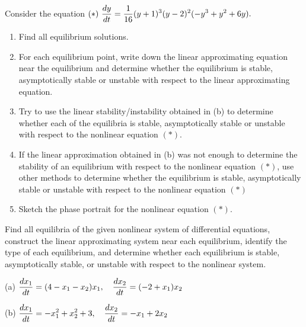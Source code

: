 \LaplaceImpulse


% 
% 





\def\OneDimLinearize{
\item
Consider the equation 
$\displaystyle (*)\  {dy \over dt}= \frac{1}{16} (y+1)^3 (y-2)^2 (-y^3+y^2+6y).$
	\begin{enumerate}
	\item
Find all equilibrium solutions.
	\item
For each equilibrium point, write down the linear approximating equation near the equilibrium and determine whether the equilibrium is stable, asymptotically stable or unstable with respect to the linear approximating equation.
	\item 
Try to use the linear stability/instability obtained in (b) to determine whether each of the equilibria is stable, asymptotically stable or unstable with respect to the nonlinear equation $(*)$.
	\item
If the linear approximation obtained in (b) was not enough to determine the stability of an equilibrium with respect to the nonlinear equation $(*)$, use other methods to determine whether the equilibrium is stable, asymptotically stable or unstable with respect to the nonlinear equation $(*)$
	\item
Sketch the phase portrait for the nonlinear equation $(*)$.
	\end{enumerate}
}

\OneDimLinearize


\item
Find all equilibria of the given nonlinear system of differential equations, 
construct the linear approximating system near each equilibrium, 
identify the type of each equilibrium, and 
determine whether each equilibrium
is stable, asymptotically stable, or unstable with respect to
the nonlinear system.

(a) $\displaystyle {dx_1\over dt}=(4-x_1-x_2)x_1, \quad {dx_2\over dt}=(-2+x_1)x_2$

(b) $\displaystyle {dx_1\over dt}= -x_1^2 +x_2^2 +3, \quad {dx_2\over dt}= -x_1 +2x_2$

